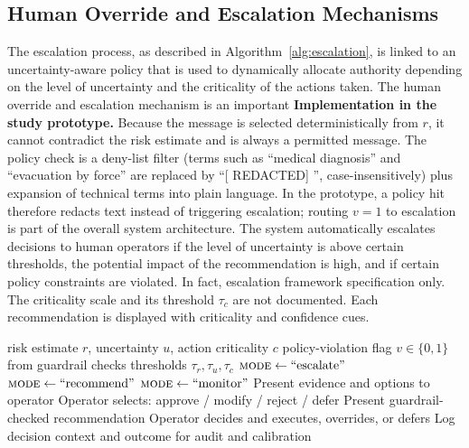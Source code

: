 \documentclass[journal]{IEEEtran}
\theoremstyle{plain}
\theoremstyle{definition}
\providecommand{\DIFaddtex}[1]{{\protect\color{blue} \sf #1}} %
\providecommand{\DIFdeltex}[1]{{\protect\color{red} \scriptsize #1}} %
\providecommand{\DIFaddbegin}{} %
\providecommand{\DIFaddend}{} %
\providecommand{\DIFdelbegin}{} %
\providecommand{\DIFdelend}{} %
\providecommand{\DIFadd}[1]{\texorpdfstring{\DIFaddtex{#1}}{#1}} %
\providecommand{\DIFdel}[1]{\texorpdfstring{\DIFdeltex{#1}}{}} %
\newcommand{\DIFscaledelfig}{0.5}
\newlength{\DIFdelgraphicswidth} %
\newlength{\DIFdelgraphicsheight} %
\newcommand{\DIFaddincludegraphics}[2][]{{\color{blue}\fbox{\DIFOincludegraphics[#1]{#2}}}} %
\newcommand{\DIFdelincludegraphics}[2][]{%
\sbox{\DIFdelgraphicsbox}{\DIFOincludegraphics[#1]{#2}}%
\settoboxwidth{\DIFdelgraphicswidth}{\DIFdelgraphicsbox} %
\settoboxtotalheight{\DIFdelgraphicsheight}{\DIFdelgraphicsbox} %
\scalebox{\DIFscaledelfig}{%
\parbox[b]{\DIFdelgraphicswidth}{\usebox{\DIFdelgraphicsbox}\\[-\baselineskip] \rule{\DIFdelgraphicswidth}{0em}}\llap{\resizebox{\DIFdelgraphicswidth}{\DIFdelgraphicsheight}{%
\setlength{\unitlength}{\DIFdelgraphicswidth}%
\begin{picture}(1,1)%
\thicklines\linethickness{2pt} %
{\color[rgb]{1,0,0}\put(0,0){\framebox(1,1){}}}%
{\color[rgb]{1,0,0}\put(0,0){\line( 1,1){1}}}%
{\color[rgb]{1,0,0}\put(0,1){\line(1,-1){1}}}%
\end{picture}%
}\hspace*{3pt}}} %
} %
\DeclareRobustCommand{\DIFaddbegin}{\DIFOaddbegin \let\includegraphics\DIFaddincludegraphics} %
\DeclareRobustCommand{\DIFaddend}{\DIFOaddend \let\includegraphics\DIFOincludegraphics} %
\DeclareRobustCommand{\DIFdelbegin}{\DIFOdelbegin \let\includegraphics\DIFdelincludegraphics} %
\DeclareRobustCommand{\DIFdelend}{\DIFOaddend \let\includegraphics\DIFOincludegraphics} %
\begin{document}
    \DIFdelbegin \subsection{\DIFdel{Human Override and Escalation Mechanisms}}
\addtocounter{subsection}{-1}%
\DIFdel{The escalation process, as described in Algorithm~\ref{alg:escalation}, is linked to an uncertainty-aware policy that is used to dynamically allocate authority depending on the level of uncertainty and the criticality of the actions taken. The human override and escalation mechanism is an important }\DIFdelend \DIFaddbegin \DIFadd{\textbf{Implementation in the study prototype.} Because the message is selected deterministically from $r$, it cannot contradict the risk estimate and is always a permitted message. The policy check is a deny-list filter (terms such as ``medical diagnosis'' and ``evacuation by force'' are replaced by ``}[\DIFadd{REDACTED}]\DIFadd{'', case-insensitively) plus expansion of technical terms into plain language. In the prototype, a policy hit therefore redacts text instead of triggering escalation; routing $v=1$ to escalation is }\DIFaddend part of the \DIFdelbegin \DIFdel{overall system architecture. The system automatically escalates decisions to human operators if the level of uncertainty is above certain thresholds, the potential impact of the recommendation is high, and if certain policy constraints are violated.
    In fact, escalation }\DIFdelend \DIFaddbegin \DIFadd{framework specification only. The criticality scale and its threshold $\tau_c$ are not documented. Each recommendation is displayed with criticality and confidence cues.
    }\begin{algorithm}[t]
        \caption{Uncertainty-aware escalation and human override policy}
        \label{alg:escalation}
        \begin{algorithmic}[1]
            \Require risk estimate $r$, uncertainty $u$, action criticality $c$
            \Require policy-violation flag $v \in \{0,1\}$ from guardrail checks
            \Require thresholds $\tau_r, \tau_u, \tau_c$
            \State $\textsc{mode} \leftarrow \text{``escalate''}$ 
            \State $\textsc{mode} \leftarrow \text{``recommend''}$ 
            \Else
            \State $\textsc{mode} \leftarrow \text{``monitor''}$
            \EndIf
            \State Present evidence and options to operator
            \State Operator selects: approve / modify / reject / defer
            \State Present guardrail-checked recommendation
            \State Operator decides and executes, overrides, or defers
            \EndIf
            \State Log decision context and outcome for audit and calibration
        \end{algorithmic}
    \end{algorithm}
\end{document}
